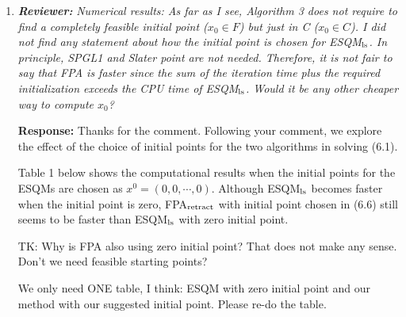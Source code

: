 \documentclass{article}
\begin{document}
\begin{enumerate}
	\item  \textit{\textbf{Reviewer:}} \textit{Numerical results: As far as I see, Algorithm 3 does not require to find a completely feasible initial point ($x_0\in F$) but just in C ($x_0\in C$). I did not find any statement about how the initial point is chosen for ESQM$_{\rm ls}$. In principle, SPGL1 and Slater point are not needed. Therefore, it is not fair to say that FPA is faster since the sum of the iteration time plus the required initialization exceeds the CPU time of ESQM$_{\rm ls}$. Would it be any other cheaper way to compute $x_0$?}
	
	\textbf{Response:} Thanks for the comment. Following your comment, we explore the effect of the choice of initial points for the two algorithms in solving (6.1). 

Table 1 below shows the computational results when the initial points for the ESQMs are chosen as
$x^0 = (0, 0, \cdots, 0)$. Although ESQM$_{\rm ls}$ becomes faster when the initial point is zero, FPA$_{\rm retract}$ with initial point chosen in (6.6) still seems to be faster than ESQM$_{\rm ls}$ with zero initial point.

{\color{red} TK: Why is FPA also using zero initial point? That does not make any sense. Don't we need feasible starting points?

We only need ONE table, I think: ESQM with zero initial point and our method with our suggested initial point. Please re-do the table.}


\end{enumerate}
\end{document}

